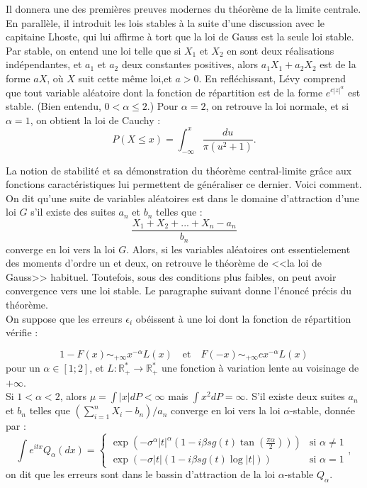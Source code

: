 \documentclass{article}
\newcommand{\R}{\mathbb R}
\begin{document}
Il donnera une des premières preuves modernes du théorème de la limite centrale. En parallèle, il introduit les lois stables à la suite d'une discussion avec le capitaine Lhoste, qui lui affirme à tort que la loi de Gauss est la seule loi stable. Par stable, on entend une loi telle que si $X_1$ et $X_2$ en sont deux réalisations indépendantes, et $a_1$ et $a_2$ deux constantes positives, alors $a_1X_1+a_2X_2 $ est de la forme $aX$, où $X$ suit cette même loi,et $a>0$. En refléchissant, Lévy comprend que tout variable aléatoire dont la fonction de répartition est de la forme $e^{c|z|^{\alpha}}$ est stable. (Bien entendu, $0<\alpha\leq2$.) Pour $\alpha=2$, on retrouve la loi normale, et si $\alpha=1$, on obtient la loi de Cauchy :
\[P(X\leq x)=\int_{-\infty}^x \frac{du}{\pi(u^2+1)}.\]

La notion de stabilité et sa démonstration du théorème central-limite grâce aux fonctions caractéristiques lui permettent de généraliser ce dernier. Voici comment. On dit qu'une suite de variables aléatoires est dans le domaine d'attraction d'une loi $G$ s'il existe des suites $a_n$ et $b_n$ telles que :
\[\frac{X_1+X_2+...+X_n-a_n}{b_n}\]
converge en loi vers la loi $G$. Alors, si les variables aléatoires ont essentielement des moments d'ordre un et deux, on retrouve le théorème de <<la loi de Gauss>> habituel. Toutefois, sous des conditions plus faibles, on peut avoir convergence vers une loi stable. Le paragraphe suivant donne l'énoncé précis du théorème.\\

On suppose que les erreurs $\epsilon_i$ obéissent à une loi dont la fonction de répartition vérifie :

\[1-F(x)\sim_{+\infty} x^{-\alpha}L(x)\quad\text{et}\quad F(-x)\sim_{+\infty}cx^{-\alpha} L(x)\]
pour un $\alpha \in [1;2]$, et $L:\R_+^*\rightarrow \R_+^*$ une fonction à variation lente au voisinage de $+\infty$.\\

 Si $1<\alpha<2$, alors $\mu=\int |x| dP<\infty$ mais $\int x^2 dP = \infty$. S'il existe deux suites $a_n$ et $b_n$ telles que $\left(\sum_{i=1}^n X_i -b_n\right)/a_n$ converge en loi vers la loi $\alpha$-stable, donnée par :
\[\int e^{itx}Q_\alpha(dx)=\left\{\begin{array}{lr}\exp(-\sigma^\alpha |t|^\alpha\left(1-i\beta sg(t)\tan(\frac{\pi\alpha}{2})\right)) & \text{si }\alpha\neq 1\\ 
\exp(-\sigma |t|\left(1-i\beta sg(t)\log|t|\right))& \text{si }\alpha=1\end{array}\right.,\]
 on dit que les erreurs sont dans le bassin d'attraction de la loi $\alpha$-stable $Q_\alpha$.\\
\end{document}
